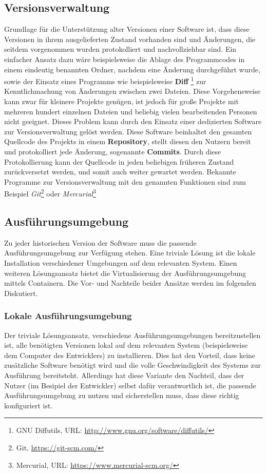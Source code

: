     \subsection{Versionsverwaltung}
        Grundlage für die Unterstützung alter Versionen einer Software ist, dass diese Versionen in ihrem ausgelieferten Zustand vorhanden sind und Änderungen, die seitdem
        vorgenommen wurden protokolliert und nachvollziehbar sind. Ein einfacher Ansatz dazu wäre beispielsweise die Ablage des Programmcodes in einem eindeutig benannten 
        Ordner, nachdem eine Änderung durchgeführt wurde, sowie der Einsatz eines Programms wie beispielsweise \textbf{Diff} \footnote{GNU Diffutils, URL: \url{http://www.gnu.org/software/diffutils/}} 
        zur Kenntlichmachung von Änderungen zwischen zwei Dateien. Diese Vorgehensweise kann zwar für kleinere Projekte genügen, ist jedoch für große Projekte mit mehreren 
        hundert einzelnen Dateien und beliebig vielen bearbeitenden Personen nicht geeignet. Dieses Problem kann durch den Einsatz einer dedizierten Software zur 
        Versionsverwaltung gelöst werden. Diese Software beinhaltet den gesamten Quellcode des Projekts in einem \textbf{Repository}, stellt diesen den Nutzern bereit 
        und protokolliert jede Änderung, sogenannte \textbf{Commits}. Durch diese Protokollierung kann der Quellcode in jeden beliebigen früheren Zustand zurückversetzt 
        werden, und somit auch weiter gewartet werden. Bekannte Programme zur Versionsverwaltung mit den genannten Funktionen sind zum Beispiel 
        \textit{Git}\footnote{Git, \url{https://git-scm.com/}} oder \textit{Mercurial}\footnote{Mercurial, URL: \url{https://www.mercurial-scm.org/}}
    \subsection{Ausführungsumgebung}\label{execution}
        Zu jeder historischen Version der Software muss die passende Ausführungsumgebung zur Verfügung stehen. Eine triviale 
        Lösung ist die lokale Installation verschiedener Umgebungen auf dem relevanten System. Einen weiteren Lösungsansatz 
        bietet die Virtualisierung der Ausführungsumgebung mittels Containern. Die Vor- und Nachteile beider Ansätze 
        werden im folgenden Diskutiert.
        \subsubsection{Lokale Ausführungsumgebung}
        Der triviale Lösungsansatz, verschiedene Ausführungsumgebungen bereitzustellen ist, alle benötigten Versionen lokal 
        auf dem relevanten System (beispielsweise dem Computer des Entwicklers) zu installieren. Dies hat den Vorteil, dass 
        keine zusätzliche Software benötigt wird und die volle Geschwindigkeit des Systems zur Ausführung bereitsteht. 
        Allerdings hat diese Variante den Nachteil, dass der Nutzer (im Besipiel der Entwickler) selbst dafür verantwortlich ist, 
        die passende Ausführungsumgebung zu nutzen und sicherstellen muss, dass diese richtig konfiguriert ist.
